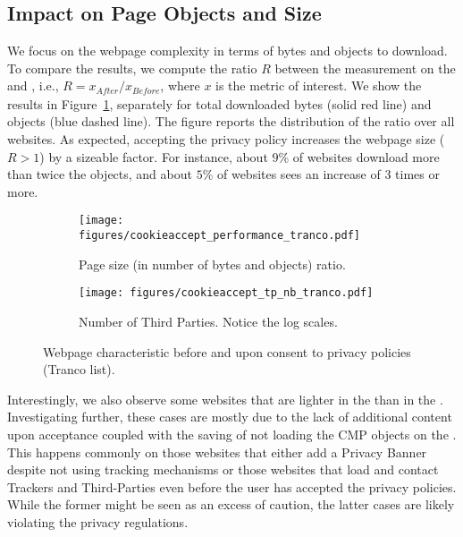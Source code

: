 \subsection{Impact on Page Objects and Size}

We focus on the webpage complexity in terms of  bytes and objects to download. To compare the results, we compute the ratio $R$ between the measurement on the \BEFORE and \AFTER, i.e., $R = x_{\textit{After}}/x_{\textit{Before}}$, where $x$ is the metric of interest. We show the results in Figure~\ref{fig:ca_perf_size}, separately for total downloaded bytes (solid red line) and objects (blue dashed line). The figure reports the distribution of the ratio over all websites. As expected, accepting the privacy policy increases the webpage size ($R>1$) by a sizeable factor. For instance, about $9$\% of websites download more than twice the objects, and about $5$\% of websites sees an increase of 3 times or more.

\begin{figure}[!t]
    \centering
    \begin{subfigure}[t]{0.495\columnwidth}
        \texttt{[image: figures/cookieaccept\_performance\_tranco.pdf]}
        \caption{Page size (in number of bytes and objects) ratio.}
        \label{fig:ca_perf_size}
    \end{subfigure}
    \begin{subfigure}[t]{0.495\columnwidth}
        \texttt{[image: figures/cookieaccept\_tp\_nb\_tranco.pdf]}
        \caption{Number of Third Parties. Notice the log scales.}
        \label{fig:ca_perf_tp}
    \end{subfigure}
	\caption{Webpage characteristic before and upon consent to privacy policies (Tranco list).}
	\label{fig:ca_perf}
\end{figure}

Interestingly, we also observe some websites that are lighter in the \AFTER than in the \BEFORE. Investigating further, these cases are mostly due to the lack of additional content upon acceptance coupled with the saving of not loading the CMP objects on the \AFTER. This happens commonly on those websites that either add a Privacy Banner despite not using tracking mechanisms or those websites that load and contact Trackers and Third-Parties even before the user has accepted the privacy policies. While the former might be seen as an excess of caution, the latter cases are likely violating the privacy regulations.

